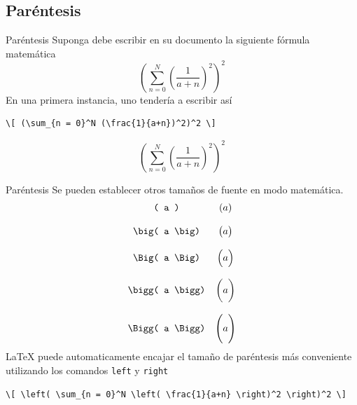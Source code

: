 \documentclass[../slides.tex]{subfiles}
\begin{document}
    \subsection{Paréntesis}

    \begin{frame}[fragile]{Paréntesis}
        Suponga debe escribir en su documento la siguiente fórmula matemática
\[ \left( \sum_{n = 0}^N \left( \frac{1}{a+n} \right)^2 \right)^2 \]
        \pause
        En una primera instancia, uno tendería a escribir así
            \begin{verbatim}
\[ (\sum_{n = 0}^N (\frac{1}{a+n})^2)^2 \]
            \end{verbatim}
        \pause
        \[ (\sum_{n = 0}^N (\frac{1}{a+n})^2)^2 \]
    \end{frame}
    
    \begin{frame}[fragile]{Paréntesis}
        Se pueden establecer otros tamaños de fuente en modo matemática.
        \[
            \begin{array}{cc}
            	\text{\texttt{( a )}} & ( a )\\
            	& \\
            	\text{\texttt{\textbackslash{}big( a \textbackslash{}big)}} & \big( a \big)\\
            	& \\
            	\text{\texttt{\textbackslash{}Big( a \textbackslash{}Big)}} & \Big( a \Big)\\
            	& \\
            	\text{\texttt{\textbackslash{}bigg( a \textbackslash{}bigg)}} & \bigg( a \bigg)\\
            	& \\
            	\text{\texttt{\textbackslash{}Bigg( a \textbackslash{}Bigg)}} & \Bigg( a \Bigg)
            \end{array}
        \]
        \pause
        \LaTeX{} puede automaticamente encajar el tamaño de paréntesis más conveniente utilizando los comandos \texttt{left} y \texttt{right}
        \footnotesize{
            \begin{verbatim}
\[ \left( \sum_{n = 0}^N \left( \frac{1}{a+n} \right)^2 \right)^2 \]
            \end{verbatim}
        }
    \end{frame}
    
\end{document}
